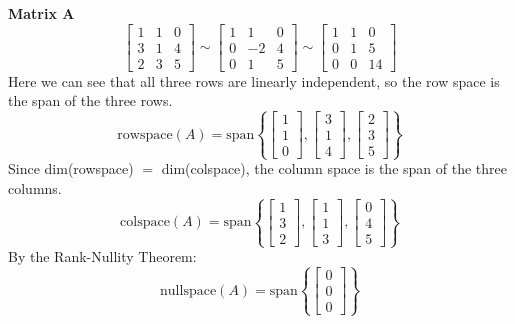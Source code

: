 \documentclass{article}
\begin{document}
\vspace{0.25cm}
\noindent\textbf{Matrix A}
$$
\begin{bmatrix} 1 & 1 & 0 \\ 3 & 1 & 4 \\ 2 & 3 & 5 \end{bmatrix} \sim
\begin{bmatrix} 1 & 1 & 0 \\ 0 & -2 & 4 \\ 0 & 1 & 5 \end{bmatrix} \sim
\begin{bmatrix} 1 & 1 & 0 \\ 0 & 1 & 5 \\ 0 & 0 & 14 \end{bmatrix}
$$
Here we can see that all three rows are linearly independent, so the row space is the span of the three rows.
$$\text{rowspace}(A) = \text{span}\left\{ \begin{bmatrix} 1 \\ 1 \\ 0 \end{bmatrix}, \begin{bmatrix} 3 \\ 1 \\ 4 \end{bmatrix}, \begin{bmatrix} 2 \\ 3 \\ 5 \end{bmatrix} \right\}$$
Since dim(rowspace) $=$ dim(colspace), the column space is the span of the three columns.
$$\text{colspace}(A) = \text{span}\left\{ \begin{bmatrix} 1 \\ 3 \\ 2 \end{bmatrix}, \begin{bmatrix} 1 \\ 1 \\ 3 \end{bmatrix}, \begin{bmatrix} 0 \\ 4 \\ 5 \end{bmatrix} \right\}$$
By the Rank-Nullity Theorem:
$$\text{nullspace}(A) = \text{span}\left\{ \begin{bmatrix} 0 \\ 0 \\ 0 \end{bmatrix} \right\}$$
\end{document}
